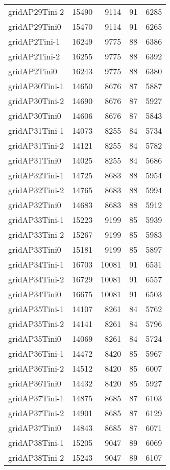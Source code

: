 \begin{longtable}{lrrrr}
gridAP29Tini-2 & 15490 & 9114 & 91 & 6285 \\
gridAP29Tini0 & 15470 & 9114 & 91 & 6265 \\
gridAP2Tini-1 & 16249 & 9775 & 88 & 6386 \\
gridAP2Tini-2 & 16255 & 9775 & 88 & 6392 \\
gridAP2Tini0 & 16243 & 9775 & 88 & 6380 \\
gridAP30Tini-1 & 14650 & 8676 & 87 & 5887 \\
gridAP30Tini-2 & 14690 & 8676 & 87 & 5927 \\
gridAP30Tini0 & 14606 & 8676 & 87 & 5843 \\
gridAP31Tini-1 & 14073 & 8255 & 84 & 5734 \\
gridAP31Tini-2 & 14121 & 8255 & 84 & 5782 \\
gridAP31Tini0 & 14025 & 8255 & 84 & 5686 \\
gridAP32Tini-1 & 14725 & 8683 & 88 & 5954 \\
gridAP32Tini-2 & 14765 & 8683 & 88 & 5994 \\
gridAP32Tini0 & 14683 & 8683 & 88 & 5912 \\
gridAP33Tini-1 & 15223 & 9199 & 85 & 5939 \\
gridAP33Tini-2 & 15267 & 9199 & 85 & 5983 \\
gridAP33Tini0 & 15181 & 9199 & 85 & 5897 \\
gridAP34Tini-1 & 16703 & 10081 & 91 & 6531 \\
gridAP34Tini-2 & 16729 & 10081 & 91 & 6557 \\
gridAP34Tini0 & 16675 & 10081 & 91 & 6503 \\
gridAP35Tini-1 & 14107 & 8261 & 84 & 5762 \\
gridAP35Tini-2 & 14141 & 8261 & 84 & 5796 \\
gridAP35Tini0 & 14069 & 8261 & 84 & 5724 \\
gridAP36Tini-1 & 14472 & 8420 & 85 & 5967 \\
gridAP36Tini-2 & 14512 & 8420 & 85 & 6007 \\
gridAP36Tini0 & 14432 & 8420 & 85 & 5927 \\
gridAP37Tini-1 & 14875 & 8685 & 87 & 6103 \\
gridAP37Tini-2 & 14901 & 8685 & 87 & 6129 \\
gridAP37Tini0 & 14843 & 8685 & 87 & 6071 \\
gridAP38Tini-1 & 15205 & 9047 & 89 & 6069 \\
gridAP38Tini-2 & 15243 & 9047 & 89 & 6107 \\

\end{longtable}
